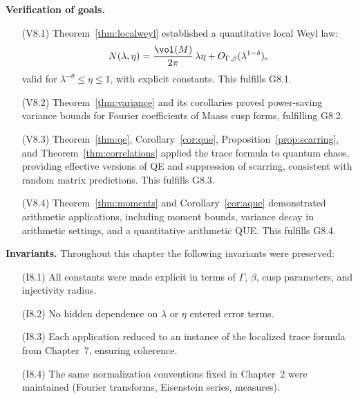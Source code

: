 \medskip

\noindent\textbf{Verification of goals.}  

\begin{itemize}
  \item[(V8.1)] Theorem~\ref{thm:localweyl} established a quantitative local Weyl law:
  \[
  N(\lambda,\eta) = \frac{\vol(M)}{2\pi}\,\lambda \eta + O_{\Gamma,\beta}(\lambda^{1-\delta}),
  \]
  valid for $\lambda^{-\theta} \leq \eta \leq 1$, with explicit constants. This fulfills G8.1.  

  \item[(V8.2)] Theorem~\ref{thm:variance} and its corollaries proved power-saving variance bounds for Fourier coefficients of Maass cusp forms, fulfilling G8.2.  

  \item[(V8.3)] Theorem~\ref{thm:qe}, Corollary~\ref{cor:que}, Proposition~\ref{prop:scarring}, and Theorem~\ref{thm:correlations} applied the trace formula to quantum chaos, providing effective versions of QE and suppression of scarring, consistent with random matrix predictions. This fulfills G8.3.  

  \item[(V8.4)] Theorem~\ref{thm:moments} and Corollary~\ref{cor:aque} demonstrated arithmetic applications, including moment bounds, variance decay in arithmetic settings, and a quantitative arithmetic QUE. This fulfills G8.4.  
\end{itemize}

\medskip

\noindent\textbf{Invariants.}  
Throughout this chapter the following invariants were preserved:

\begin{itemize}
  \item[(I8.1)] All constants were made explicit in terms of $\Gamma$, $\beta$, cusp parameters, and injectivity radius.  
  \item[(I8.2)] No hidden dependence on $\lambda$ or $\eta$ entered error terms.  
  \item[(I8.3)] Each application reduced to an instance of the localized trace formula from Chapter~7, ensuring coherence.  
  \item[(I8.4)] The same normalization conventions fixed in Chapter~2 were maintained (Fourier transforms, Eisenstein series, measures).  
\end{itemize}

\medskip

